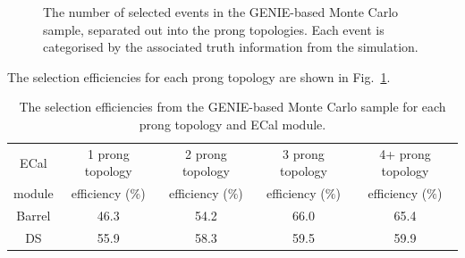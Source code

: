 \begin{figure}
  \centering
  \caption{The number of selected events in the GENIE-based Monte Carlo sample, separated out into the prong topologies.  Each event is categorised by the associated truth information from the simulation.}
  \label{fig:ProngStackSelectedGENIE}
\end{figure}
The selection efficiencies for each prong topology are shown in Fig.~\ref{table:SelEfficiencyGENIE}.
\begin{table}
  \begin{tabular}{ c c c c c }
    ECal & 1 prong topology & 2 prong topology & 3 prong topology & 4+ prong topology \\
    module & efficiency ($\%$)& efficiency ($\%$)& efficiency ($\%$)& efficiency ($\%$) \\ \hline \hline
    Barrel & 46.3 & 54.2 & 66.0 & 65.4 \\
    DS & 55.9 & 58.3 & 59.5 & 59.9\\
  \end{tabular}
  \caption{The selection efficiencies from the GENIE-based Monte Carlo sample for each prong topology and ECal module.}
  \label{table:SelEfficiencyGENIE}
\end{table}
